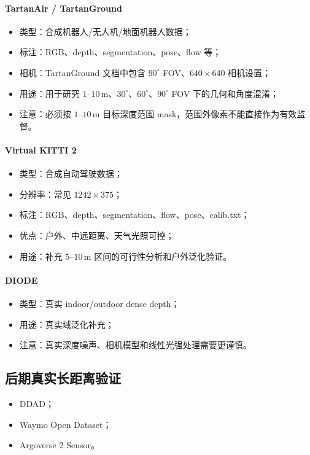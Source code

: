 \documentclass[11pt,a4paper,fontset=none]{ctexart}
\begin{document}
\paragraph{TartanAir / TartanGround}
\begin{itemize}
  \item 类型：合成机器人/无人机/地面机器人数据；
  \item 标注：RGB、depth、segmentation、pose、flow 等；
  \item 相机：TartanGround 文档中包含 $90^\circ$ FOV、$640\times640$ 相机设置；
  \item 用途：用于研究 $1$--$10\,\mathrm{m}$、$30^\circ$、$60^\circ$、$90^\circ$ FOV 下的几何和角度混淆；
  \item 注意：必须按 $1$--$10\,\mathrm{m}$ 目标深度范围 mask，范围外像素不能直接作为有效监督。
\end{itemize}

\paragraph{Virtual KITTI 2}
\begin{itemize}
  \item 类型：合成自动驾驶数据；
  \item 分辨率：常见 $1242\times375$；
  \item 标注：RGB、depth、segmentation、flow、pose、calib.txt；
  \item 优点：户外、中远距离、天气光照可控；
  \item 用途：补充 $5$--$10\,\mathrm{m}$ 区间的可行性分析和户外泛化验证。
\end{itemize}

\paragraph{DIODE}
\begin{itemize}
  \item 类型：真实 indoor/outdoor dense depth；
  \item 用途：真实域泛化补充；
  \item 注意：真实深度噪声、相机模型和线性光强处理需要更谨慎。
\end{itemize}

\subsection{后期真实长距离验证}

\begin{itemize}
  \item DDAD；
  \item Waymo Open Dataset；
  \item Argoverse 2 Sensor。
\end{itemize}
\end{document}
